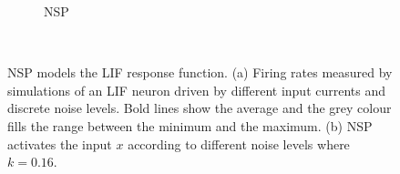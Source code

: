 \begin{figure}[bht!]
\begin{subfigure}[t]{0.48\textwidth}
			\DIFaddendFL \caption{NSP}
		\end{subfigure}\DIFaddbeginFL \\
		\DIFaddendFL \caption[NSP models the LIF response function.]{
			NSP models the LIF response function.
			(a) Firing rates measured by simulations of an LIF neuron driven by different input currents and discrete noise levels.
			Bold lines show the average and the grey colour fills the range between the minimum and the maximum.
			(b) NSP activates the input $x$ according to different noise levels where \DIFaddbeginFL {}\DIFaddendFL $k=0.16$.}
		\label{fig:nsp}
	\end{figure}

	
	
